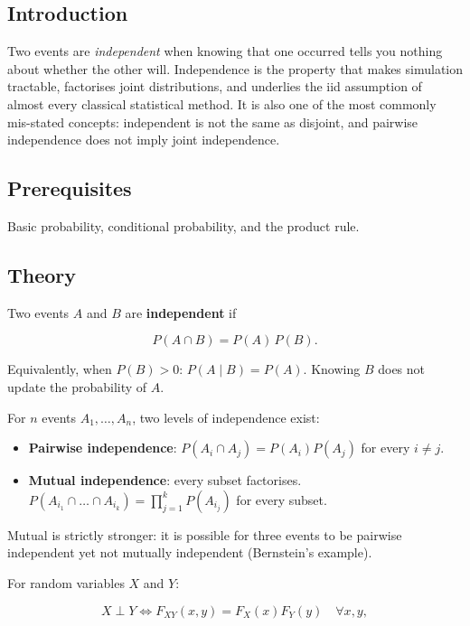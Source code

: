 \documentclass[
]{article}
\author{}
\date{\vspace{-2.5em}}
\providecommand{\tightlist}{%
  \setlength{\itemsep}{0pt}\setlength{\parskip}{0pt}}
\begin{document}
\subsection{Introduction}\label{introduction}

Two events are \emph{independent} when knowing that one occurred tells
you nothing about whether the other will. Independence is the property
that makes simulation tractable, factorises joint distributions, and
underlies the iid assumption of almost every classical statistical
method. It is also one of the most commonly mis-stated concepts:
independent is not the same as disjoint, and pairwise independence does
not imply joint independence.

\subsection{Prerequisites}\label{prerequisites}

Basic probability, conditional probability, and the product rule.

\subsection{Theory}\label{theory}

Two events \(A\) and \(B\) are \textbf{independent} if

\[P(A \cap B) = P(A) \, P(B).\]

Equivalently, when \(P(B) > 0\): \(P(A \mid B) = P(A)\). Knowing \(B\)
does not update the probability of \(A\).

For \(n\) events \(A_1, \ldots, A_n\), two levels of independence exist:

\begin{itemize}
\tightlist
\item
  \textbf{Pairwise independence}: \(P(A_i \cap A_j) = P(A_i) P(A_j)\)
  for every \(i \neq j\).
\item
  \textbf{Mutual independence}: every subset factorises.
  \(P(A_{i_1} \cap \ldots \cap A_{i_k}) = \prod_{j=1}^k P(A_{i_j})\) for
  every subset.
\end{itemize}

Mutual is strictly stronger: it is possible for three events to be
pairwise independent yet not mutually independent (Bernstein's example).

For random variables \(X\) and \(Y\):

\[X \perp Y \iff F_{XY}(x, y) = F_X(x) F_Y(y) \quad \forall x, y,\]
\end{document}
